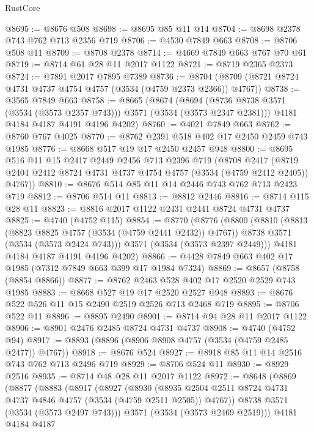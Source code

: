 \begin{lexlean}{RustCore}
\begin{coremodule}
@8695 := @8676 @508
@8698 := @8695 @85 @11 @14
@8704 := @8698 @2378 @743 @762 @713 @2356 @719
@8706 := @4530 @7849 @663
@8708 := @8706 @508 @11
@8709 := @8708 @2378
@8714 := @4669 @7849 @663 @767 @70 @61
@8719 := @8714 @61 @28 @11 @2017 @1122
@8721 := @8719 @2365 @2373
@8724 := @7891 @2017 @7895 @7389
@8736 := @8704 (@8709 (@8721 @8724 @4731 @4737 @4754 @4757 (@3534 (@4759 @2373 @2366)) @4767))
@8738 := @3565 @7849 @663
@8758 := @8665
    (@8674
      (@8694 (@8736 @8738 @3571 (@3534 (@3573 @2357 @743))) @3571 (@3534 (@3573 @2347 @2381)))
      @4181
      @4184
      @4187
      @4191
      @4196
      @4202)
@8760 := @4021 @7849 @663
@8762 := @8760 @767 @4025
@8770 := @8762 @2391 @518 @402 @17 @2450 @2459 @743 @1985
@8776 := @8668 @517 @19 @17 @2450 @2457 @948
@8800 := @8695
    @516
    @11
    @15
    @2417
    @2449
    @2456
    @713
    @2396
    @719
    (@8708
      @2417
      (@8719 @2404 @2412 @8724 @4731 @4737 @4754 @4757 (@3534 (@4759 @2412 @2405)) @4767))
@8810 := @8676 @514 @85 @11 @14 @2446 @743 @762 @713 @2423 @719
@8812 := @8706 @514 @11
@8813 := @8812 @2446
@8816 := @8714 @115 @28 @11
@8823 := @8816 @2017 @1122 @2431 @2441 @8724 @4731 @4737
@8825 := @4740 (@4752 @115)
@8854 := @8770
    (@8776
      (@8800
        (@8810
          (@8813 (@8823 @8825 @4757 (@3534 (@4759 @2441 @2432)) @4767))
          @8738
          @3571
          (@3534 (@3573 @2424 @743)))
        @3571
        (@3534 (@3573 @2397 @2449)))
      @4181
      @4184
      @4187
      @4191
      @4196
      @4202)
@8866 := @4428 @7849 @663 @402 @17 @1985 (@7312 @7849 @663 @399 @17 @1984 @7324)
@8869 := @8657 (@8758 (@8854 @8866))
@8877 := @8762 @2463 @528 @402 @17 @2520 @2529 @743 @1985
@8883 := @8668 @527 @19 @17 @2520 @2527 @948
@8893 := @8676 @522 @526 @11 @15 @2490 @2519 @2526 @713 @2468 @719
@8895 := @8706 @522 @11
@8896 := @8895 @2490
@8901 := @8714 @94 @28 @11 @2017 @1122
@8906 := @8901 @2476 @2485 @8724 @4731 @4737
@8908 := @4740 (@4752 @94)
@8917 := @8893 (@8896 (@8906 @8908 @4757 (@3534 (@4759 @2485 @2477)) @4767))
@8918 := @8676 @524
@8927 := @8918 @85 @11 @14 @2516 @743 @762 @713 @2496 @719
@8929 := @8706 @524 @11
@8930 := @8929 @2516
@8935 := @8714 @48 @28 @11 @2017 @1122
@8972 := @8648
    (@8869
      (@8877
        (@8883
          (@8917
            (@8927
              (@8930
                (@8935 @2504 @2511 @8724 @4731 @4737 @4846 @4757 (@3534 (@4759 @2511 @2505)) @4767))
              @8738
              @3571
              (@3534 (@3573 @2497 @743)))
            @3571
            (@3534 (@3573 @2469 @2519)))
          @4181
          @4184
          @4187

\end{coremodule}
\end{lexlean}
